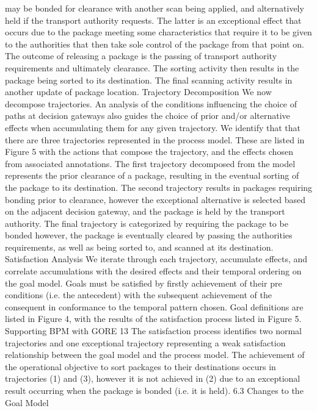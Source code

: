 may be bonded for clearance with another scan being applied, and alternatively
held if the transport authority requests. The latter is an exceptional effect that
occurs due to the package meeting some characteristics that require it to be
given to the authorities that then take sole control of the package from that
point on. The outcome of releasing a package is the passing of transport authority requirements and ultimately clearance. The sorting activity then results in
the package being sorted to its destination. The final scanning activity results in
another update of package location.
Trajectory Decomposition We now decompose trajectories. An analysis of
the conditions influencing the choice of paths at decision gateways also guides
the choice of prior and/or alternative effects when accumulating them for any
given trajectory. We identify that that there are three trajectories represented
in the process model. These are listed in Figure 5 with the actions that compose
the trajectory, and the effects chosen from associated annotations.
The first trajectory decomposed from the model represents the prior clearance of a package, resulting in the eventual sorting of the package to its destination. The second trajectory results in packages requiring bonding prior to
clearance, however the exceptional alternative is selected based on the adjacent
decision gateway, and the package is held by the transport authority. The final
trajectory is categorized by requiring the package to be bonded however, the package is eventually cleared by passing the authorities requirements, as well as being
sorted to, and scanned at its destination.
Satisfaction Analysis We iterate through each trajectory, accumulate effects,
and correlate accumulations with the desired effects and their temporal ordering
on the goal model. Goals must be satisfied by firstly achievement of their pre
conditions (i.e. the antecedent) with the subsequent achievement of the consequent in conformance to the temporal pattern chosen. Goal definitions are listed
in Figure 4, with the results of the satisfaction process listed in Figure 5.
Supporting BPM with GORE 13
The satisfaction process identifies two normal trajectories and one exceptional trajectory representing a weak satisfaction relationship between the goal
model and the process model. The achievement of the operational objective to
sort packages to their destinations occurs in trajectories (1) and (3), however it
is not achieved in (2) due to an exceptional result occurring when the package
is bonded (i.e. it is held).
6.3 Changes to the Goal Model
